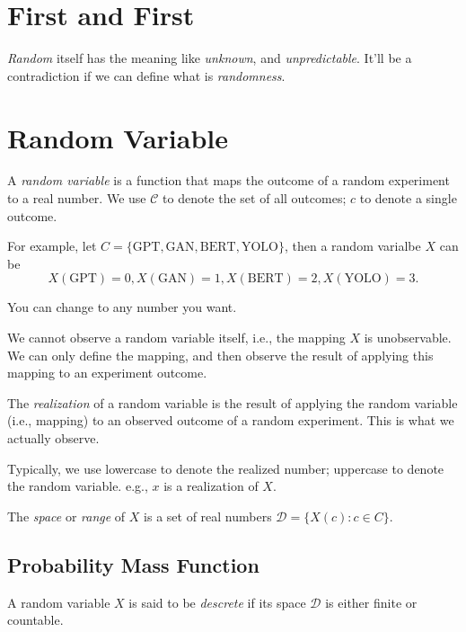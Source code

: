 \documentclass{article}
\begin{document}
    \section{First and First}

        \textit{Random} itself has the meaning like \textit{unknown}, and
        \textit{unpredictable}. It'll be a contradiction if we can define
        what is \textit{randomness}.

    \section{Random Variable}

        A \textit{random variable} is a function that maps the outcome of a
        random experiment to a real number. We use $ \mathcal{C} $ to
        denote the set of all outcomes; $ c $ to denote a single outcome.

        For example, let $ C =  \{ \text{GPT}, \text{GAN}, \text{BERT},
        \text{YOLO} \} $, then a random varialbe $ X $ can be
        \begin{equation*}
             X(\text{GPT}) = 0, X(\text{GAN}) = 1, X(\text{BERT}) = 2,
             X(\text{YOLO}) = 3.
        \end{equation*}

        You can change to any number you want.

        We cannot observe a random variable itself, i.e., the mapping $ X $
        is unobservable. We can only define the mapping, and then observe
        the result of applying this mapping to an experiment outcome.

        The \textit{realization} of a random variable is the result of
        applying the random variable (i.e., mapping) to an observed outcome
        of a random experiment. This is what we actually observe.

        Typically, we use lowercase to denote the realized number;
        uppercase to denote the random variable. e.g., $ x $ is a
        realization of $ X $.

        The \textit{space} or \textit{range} of $ X $ is a set of real
        numbers $ \mathcal{D} = \{ X(c): c \in C \} $.

        \subsection{Probability Mass Function}

            A random variable $ X $ is said to be \textit{descrete} if its
            space $ \mathcal{D} $ is either finite or countable.
\end{document}
